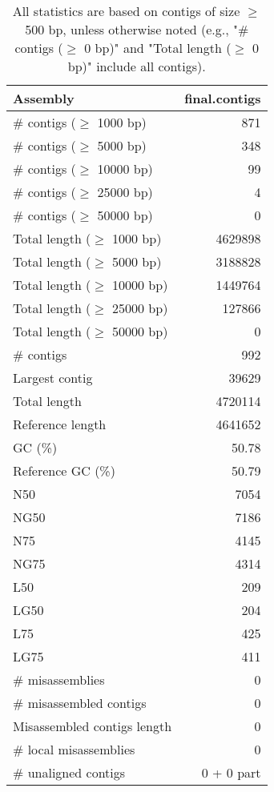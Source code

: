 \documentclass[12pt,a4paper]{article}
\begin{document}
\begin{table}[ht]
\begin{center}
\caption{All statistics are based on contigs of size $\geq$ 500 bp, unless otherwise noted (e.g., "\# contigs ($\geq$ 0 bp)" and "Total length ($\geq$ 0 bp)" include all contigs).}
\begin{tabular}{|l*{1}{|r}|}
\hline
Assembly & final.contigs \\ \hline
\# contigs ($\geq$ 1000 bp) & 871 \\ \hline
\# contigs ($\geq$ 5000 bp) & 348 \\ \hline
\# contigs ($\geq$ 10000 bp) & 99 \\ \hline
\# contigs ($\geq$ 25000 bp) & 4 \\ \hline
\# contigs ($\geq$ 50000 bp) & 0 \\ \hline
Total length ($\geq$ 1000 bp) & 4629898 \\ \hline
Total length ($\geq$ 5000 bp) & 3188828 \\ \hline
Total length ($\geq$ 10000 bp) & 1449764 \\ \hline
Total length ($\geq$ 25000 bp) & 127866 \\ \hline
Total length ($\geq$ 50000 bp) & 0 \\ \hline
\# contigs & 992 \\ \hline
Largest contig & 39629 \\ \hline
Total length & 4720114 \\ \hline
Reference length & 4641652 \\ \hline
GC (\%) & 50.78 \\ \hline
Reference GC (\%) & 50.79 \\ \hline
N50 & 7054 \\ \hline
NG50 & 7186 \\ \hline
N75 & 4145 \\ \hline
NG75 & 4314 \\ \hline
L50 & 209 \\ \hline
LG50 & 204 \\ \hline
L75 & 425 \\ \hline
LG75 & 411 \\ \hline
\# misassemblies & 0 \\ \hline
\# misassembled contigs & 0 \\ \hline
Misassembled contigs length & 0 \\ \hline
\# local misassemblies & 0 \\ \hline
\# unaligned contigs & 0 + 0 part \\ \hline

\end{tabular}
\end{center}
\end{table}
\end{document}
